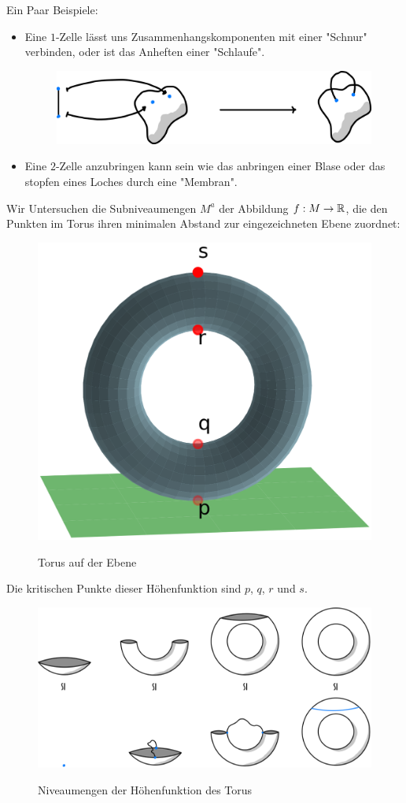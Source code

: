 Ein Paar Beispiele: 
\begin{itemize}
    \item Eine $1$-Zelle lässt uns Zusammenhangskomponenten mit einer "Schnur"
            verbinden, oder ist das Anheften einer "Schlaufe".
            \begin{figure}[H]
                \centering
                \includegraphics[width=0.45\linewidth]{resources/Me-Diagram1-attaching-a-1-cell.jpeg}
                \label{fig:me-diagram1}
            \end{figure}
    \item Eine $2$-Zelle anzubringen kann sein wie das anbringen einer Blase oder
        das stopfen eines Loches durch eine "Membran".
\end{itemize}

Wir Untersuchen die Subniveaumengen $M^a$ der Abbildung $f:M \to { \mathbb R }$, die den 
Punkten im Torus ihren minimalen Abstand zur eingezeichneten Ebene zuordnet:

\begin{figure}[H]
    \centering
    \includegraphics[width=0.6\linewidth]{resources/Me-Diagram2-torus-plane.png}
    \label{fig:me-diagram2}
    \caption{Torus auf der Ebene}
\end{figure}

Die kritischen Punkte dieser Höhenfunktion sind $p$, $q$, $r$ und $s$.

\begin{figure}[H]
    \centering
    \includegraphics[width=0.8\linewidth]{resources/Me-Diagram3-torus-example.jpeg}
    \label{fig:me-diagram3}
    \caption{Niveaumengen der Höhenfunktion des Torus}
\end{figure}

